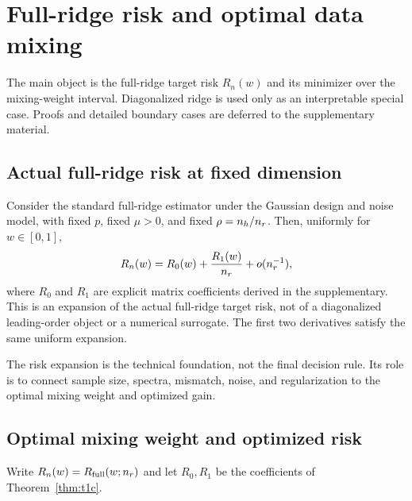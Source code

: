 \section{Full-ridge risk and optimal data mixing}
\label{sec:theory}

The main object is the full-ridge target risk $R_n(w)$ and its minimizer over the mixing-weight interval. Diagonalized ridge is used only as an interpretable special case. Proofs and detailed boundary cases are deferred to the supplementary material.

\subsection{Actual full-ridge risk at fixed dimension}

\begin{theorem}\label{thm:t1c}
Consider the standard full-ridge estimator under the Gaussian design and noise model, with fixed $p$, fixed $\mu>0$, and fixed $\rho=n_h/n_r$. Then, uniformly for $w\in[0,1]$,
\begin{equation}
  R_n(w)=R_0(w)+\frac{R_1(w)}{n_r}+o(n_r^{-1}),
  \label{eq:t1c-main}
\end{equation}
where $R_0$ and $R_1$ are explicit matrix coefficients derived in the supplementary. This is an expansion of the actual full-ridge target risk, not of a diagonalized leading-order object or a numerical surrogate. The first two derivatives satisfy the same uniform expansion.
\end{theorem}

The risk expansion is the technical foundation, not the final decision rule. Its role is to connect sample size, spectra, mismatch, noise, and regularization to the optimal mixing weight and optimized gain.

\subsection{Optimal mixing weight and optimized risk}

Write $R_n(w)=R_{\mathrm{full}}(w;n_r)$ and let $R_0,R_1$ be the coefficients of Theorem~\ref{thm:t1c}.

